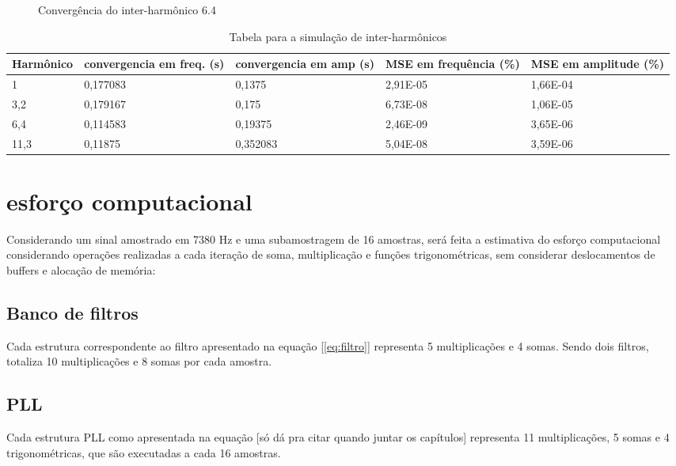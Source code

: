 \begin{figure}[H]
	\centering    
	\def\svgscale{1}
	
	\caption{Convergência do inter-harmônico 6.4}
	\label{fig:esquema_pll}
\end{figure}

\begin{table}[H]
	\centering
	\begin{tabular}{|p{2.5cm}|p{2.5cm}|p{2.5cm}|p{2.5cm}|p{2.5cm}|}
		\hline
		Harmônico & convergencia em freq. (s)& convergencia em amp (s) & MSE em frequência (\%) & MSE em amplitude (\%)\\
		\hline
		1    & 0,177083 & 0,1375   & 2,91E-05 & 1,66E-04 \\
		3,2  & 0,179167 & 0,175    & 6,73E-08 & 1,06E-05 \\
		6,4  & 0,114583 & 0,19375  & 2,46E-09 & 3,65E-06 \\
		11,3 & 0,11875  & 0,352083 & 5,04E-08 & 3,59E-06 \\
		\hline
	\end{tabular}
	\caption{Tabela para a simulação de inter-harmônicos}
\end{table}


\section{esforço computacional}

\indent Considerando um sinal amostrado em 7380  Hz e uma subamostragem de 16 amostras, será feita a estimativa do esforço computacional considerando operações realizadas a cada iteração de soma, multiplicação e funções trigonométricas, sem considerar deslocamentos de buffers e alocação de memória:

\subsection{Banco de filtros}

\indent Cada estrutura correspondente ao filtro apresentado na equação [\ref{eq:filtro}] representa 5 multiplicações e 4 somas. Sendo dois filtros, totaliza 10 multiplicações e 8 somas por cada amostra.

\subsection{PLL}

\indent Cada estrutura PLL como apresentada na equação [só dá pra citar quando juntar os capítulos] representa 11 multiplicações, 5 somas e 4 trigonométricas, que são executadas a cada 16 amostras. 

